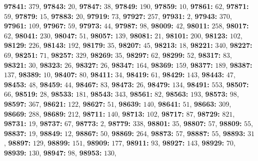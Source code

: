 \textsf{\bfseries 97841:} $379$, \textsf{\bfseries 97843:} $20$, \textsf{\bfseries 97847:} $38$, \textsf{\bfseries 97849:} $190$, \textsf{\bfseries 97859:} $10$, \textsf{\bfseries 97861:} $62$, \textsf{\bfseries 97871:} $59$, \textsf{\bfseries 97879:} $15$, \textsf{\bfseries 97883:} $20$, \textsf{\bfseries 97919:} $73$, \textsf{\bfseries 97927:} $257$, \textsf{\bfseries 97931:} $2$, \textsf{\bfseries 97943:} $370$, \textsf{\bfseries 97961:} $109$, \textsf{\bfseries 97967:} $59$, \textsf{\bfseries 97973:} $44$, \textsf{\bfseries 97987:} $98$, \textsf{\bfseries 98009:} $42$, \textsf{\bfseries 98011:} $258$, \textsf{\bfseries 98017:} $62$, \textsf{\bfseries 98041:} $230$, \textsf{\bfseries 98047:} $51$, \textsf{\bfseries 98057:} $139$, \textsf{\bfseries 98081:} $21$, \textsf{\bfseries 98101:} $200$, \textsf{\bfseries 98123:} $102$, \textsf{\bfseries 98129:} $226$, \textsf{\bfseries 98143:} $192$, \textsf{\bfseries 98179:} $35$, \textsf{\bfseries 98207:} $45$, \textsf{\bfseries 98213:} $18$, \textsf{\bfseries 98221:} $340$, \textsf{\bfseries 98227:} $69$, \textsf{\bfseries 98251:} $71$, \textsf{\bfseries 98257:} $329$, \textsf{\bfseries 98269:} $35$, \textsf{\bfseries 98297:} $62$, \textsf{\bfseries 98299:} $52$, \textsf{\bfseries 98317:} $83$, \textsf{\bfseries 98321:} $30$, \textsf{\bfseries 98323:} $26$, \textsf{\bfseries 98327:} $26$, \textsf{\bfseries 98347:} $164$, \textsf{\bfseries 98369:} $159$, \textsf{\bfseries 98377:} $189$, \textsf{\bfseries 98387:} $137$, \textsf{\bfseries 98389:} $10$, \textsf{\bfseries 98407:} $80$, \textsf{\bfseries 98411:} $34$, \textsf{\bfseries 98419:} $61$, \textsf{\bfseries 98429:} $143$, \textsf{\bfseries 98443:} $47$, \textsf{\bfseries 98453:} $48$, \textsf{\bfseries 98459:} $44$, \textsf{\bfseries 98467:} $83$, \textsf{\bfseries 98473:} $26$, \textsf{\bfseries 98479:} $134$, \textsf{\bfseries 98491:} $553$, \textsf{\bfseries 98507:} $66$, \textsf{\bfseries 98519:} $28$, \textsf{\bfseries 98533:} $181$, \textsf{\bfseries 98543:} $343$, \textsf{\bfseries 98561:} $82$, \textsf{\bfseries 98563:} $193$, \textsf{\bfseries 98573:} $98$, \textsf{\bfseries 98597:} $367$, \textsf{\bfseries 98621:} $122$, \textsf{\bfseries 98627:} $51$, \textsf{\bfseries 98639:} $140$, \textsf{\bfseries 98641:} $51$, \textsf{\bfseries 98663:} $309$, \textsf{\bfseries 98669:} $288$, \textsf{\bfseries 98689:} $212$, \textsf{\bfseries 98711:} $140$, \textsf{\bfseries 98713:} $102$, \textsf{\bfseries 98717:} $87$, \textsf{\bfseries 98729:} $821$, \textsf{\bfseries 98731:} $19$, \textsf{\bfseries 98737:} $67$, \textsf{\bfseries 98773:} $2$, \textsf{\bfseries 98779:} $338$, \textsf{\bfseries 98801:} $35$, \textsf{\bfseries 98807:} $57$, \textsf{\bfseries 98809:} $55$, \textsf{\bfseries 98837:} $19$, \textsf{\bfseries 98849:} $12$, \textsf{\bfseries 98867:} $50$, \textsf{\bfseries 98869:} $264$, \textsf{\bfseries 98873:} $57$, \textsf{\bfseries 98887:} $55$, \textsf{\bfseries 98893:} $31$, \textsf{\bfseries 98897:} $129$, \textsf{\bfseries 98899:} $151$, \textsf{\bfseries 98909:} $177$, \textsf{\bfseries 98911:} $93$, \textsf{\bfseries 98927:} $143$, \textsf{\bfseries 98929:} $70$, \textsf{\bfseries 98939:} $130$, \textsf{\bfseries 98947:} $98$, \textsf{\bfseries 98953:} $130$, 
